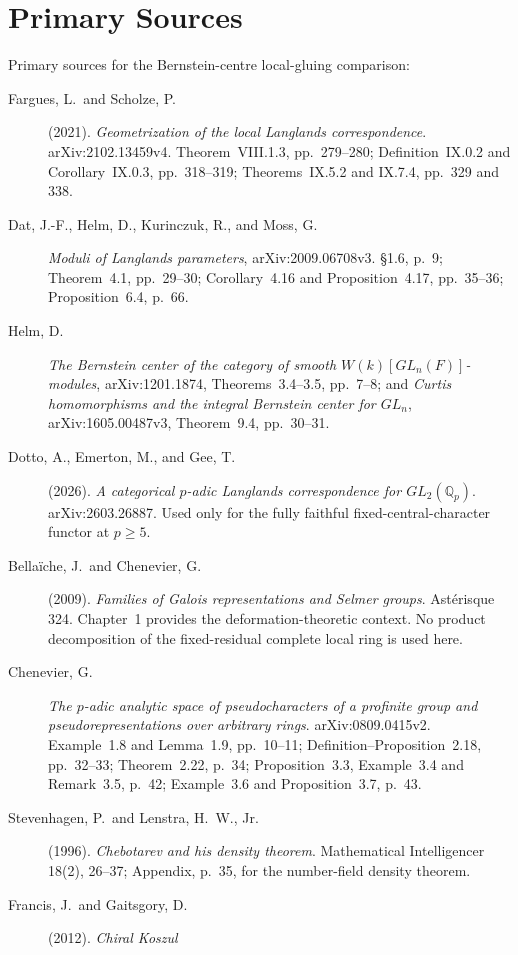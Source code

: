 \section{Primary Sources}
\label{v4-arith:w10-e:bibliography}

Primary sources for the Bernstein-centre local-gluing comparison:

\begin{description}
\item[Fargues, L.\ and Scholze, P.] (2021).
\emph{Geometrization of the local Langlands correspondence}.
arXiv:2102.13459v4. Theorem~VIII.1.3, pp.~279--280;
Definition~IX.0.2 and Corollary~IX.0.3, pp.~318--319;
Theorems~IX.5.2 and IX.7.4, pp.~329 and 338.
\item[Dat, J.-F., Helm, D., Kurinczuk, R., and Moss, G.]
\emph{Moduli of Langlands parameters}, arXiv:2009.06708v3.
\S1.6, p.~9; Theorem~4.1, pp.~29--30;
Corollary~4.16 and Proposition~4.17, pp.~35--36;
Proposition~6.4, p.~66.
\item[Helm, D.] \emph{The Bernstein center of the category of smooth
$W(k)[GL_n(F)]$-modules}, arXiv:1201.1874,
Theorems~3.4--3.5, pp.~7--8; and
\emph{Curtis homomorphisms and the integral Bernstein center for
$GL_n$}, arXiv:1605.00487v3, Theorem~9.4, pp.~30--31.
\item[Dotto, A., Emerton, M., and Gee, T.] (2026). \emph{A categorical
\(p\)-adic Langlands correspondence for \(GL_{2}(\mathbb{Q}_{p})\)}.
arXiv:2603.26887. Used only for the fully faithful
fixed-central-character functor at \(p\geq 5\).
\item[Bella\"iche, J.\ and Chenevier, G.] (2009). \emph{Families of
Galois representations and Selmer groups}. Ast\'erisque 324.
Chapter~1 provides the deformation-theoretic context. No product
decomposition of the fixed-residual complete local ring is used here.
\item[Chenevier, G.] \emph{The $p$-adic analytic space of
pseudocharacters of a profinite group and pseudorepresentations over
arbitrary rings}. arXiv:0809.0415v2. Example~1.8 and Lemma~1.9,
pp.~10--11; Definition--Proposition~2.18, pp.~32--33; Theorem~2.22,
p.~34; Proposition~3.3, Example~3.4 and Remark~3.5, p.~42;
Example~3.6 and Proposition~3.7, p.~43.
\item[Stevenhagen, P.\ and Lenstra, H.\ W., Jr.] (1996).
\emph{Chebotarev and his density theorem}. Mathematical Intelligencer
18(2), 26--37; Appendix, p.~35, for the number-field density theorem.
\item[Francis, J.\ and Gaitsgory, D.] (2012). \emph{Chiral Koszul
}
\end{description}

